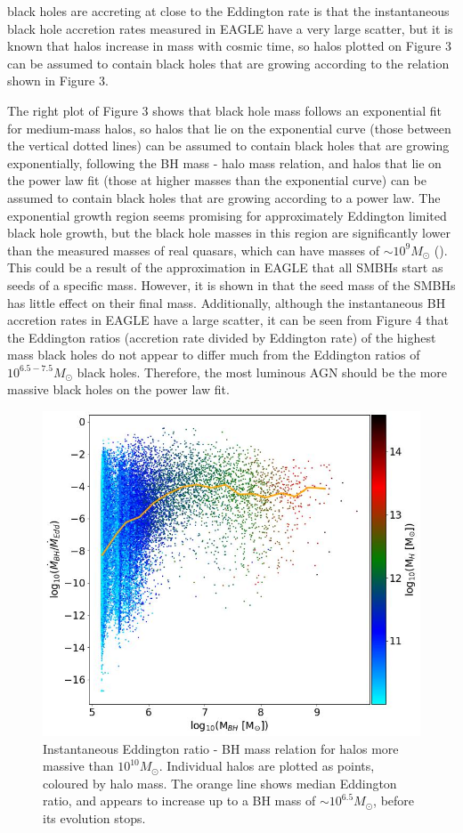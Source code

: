 \documentclass[12pt]{article}%
\begin{document}
\noindent black holes are accreting at close to the Eddington rate is that the instantaneous black hole accretion rates measured in EAGLE have a very large scatter, but it is known that halos increase in mass with cosmic time, so halos plotted on Figure 3 can be assumed to contain black holes that are growing according to the relation shown in Figure 3.

The right plot of Figure 3 shows that black hole mass follows an exponential fit for medium-mass halos, so halos that lie on the exponential curve (those between the vertical dotted lines) can be assumed to contain black holes that are growing exponentially, following the BH mass - halo mass relation, and halos that lie on the power law fit (those at higher masses than the exponential curve) can be assumed to contain black holes that are growing according to a power law. The exponential growth region seems promising for approximately Eddington limited black hole growth, but the black hole masses in this region are significantly lower than the measured masses of real quasars, which can have masses of $\sim10^9M_\odot$ (\cite{Marshall}). This could be a result of the approximation in EAGLE that all SMBHs start as seeds of a specific mass. However, it is shown in \cite{Quasar} that the seed mass of the SMBHs has little effect on their final mass. Additionally, although the instantaneous BH accretion rates in EAGLE have a large scatter, it can be seen from Figure 4 that the Eddington ratios (accretion rate divided by Eddington rate) of the highest mass black holes do not appear to differ much from the Eddington ratios of $10^{6.5-7.5}M_\odot$ black holes. Therefore, the most luminous AGN should be the more massive black holes on the power law fit.

\begin{figure}[H]
\centering
\includegraphics[width=\linewidth]{Plot_12.jpeg}
\caption{Instantaneous Eddington ratio - BH mass relation for halos more massive than $10^{10}M_\odot$. Individual halos are plotted as points, coloured by halo mass. The orange line shows median Eddington ratio, and appears to increase up to a BH mass of $\sim10^{6.5}M_\odot$, before its evolution stops.}
\label{fig:4}
\end{figure}
\end{document}
